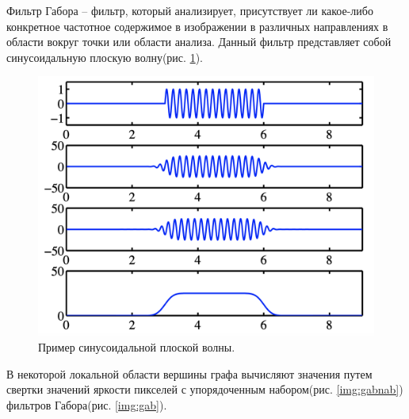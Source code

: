 Фильтр Габора -- фильтр, который анализирует, присутствует ли какое-либо конкретное частотное содержимое 
в изображении в различных направлениях в области вокруг точки или области анализа. Данный фильтр представляет собой 
синусоидальную плоскую волну(рис. \ref{img:sinuso}).\cite{gb}
\begin{figure}[h]
    \centering
    \includegraphics[width=0.35\textheight]{img/sin.png}
    \caption{Пример синусоидальной плоской волны.}
    \label{img:sinuso}
\end{figure}

\vspace{\baselineskip}
\vspace{\baselineskip}
\vspace{\baselineskip}
\vspace{\baselineskip}
\vspace{\baselineskip}
\vspace{\baselineskip}
\vspace{\baselineskip}

В некоторой локальной области вершины графа вычисляют значения
путем свертки значений яркости пикселей с упорядоченным набором(рис. \ref{img:gabnab}) фильтров Габора(рис. \ref{img:gab}).

